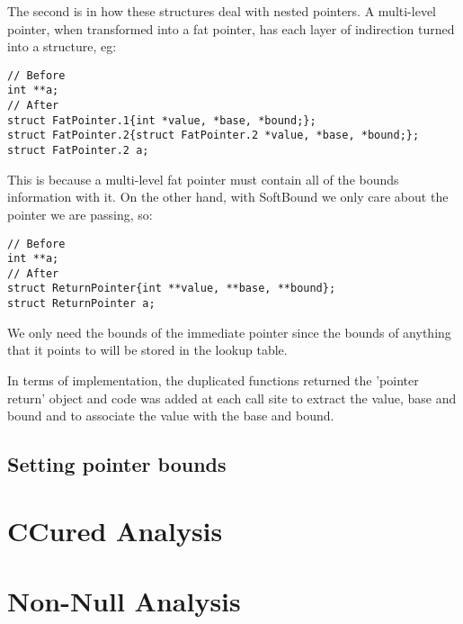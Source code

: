 The second is in how these structures deal with nested pointers.
A multi-level pointer, when transformed into a fat pointer, has each layer of indirection turned into a structure, eg:

\begin{verbatim}
// Before
int **a;
// After
struct FatPointer.1{int *value, *base, *bound;};
struct FatPointer.2{struct FatPointer.2 *value, *base, *bound;};
struct FatPointer.2 a;
\end{verbatim}

This is because a multi-level fat pointer must contain all of the bounds information with it.
On the other hand, with SoftBound we only care about the pointer we are passing, so:

\begin{verbatim}
// Before
int **a;
// After
struct ReturnPointer{int **value, **base, **bound};
struct ReturnPointer a;
\end{verbatim}

We only need the bounds of the immediate pointer since the bounds of anything that it points to will be stored in the lookup table.

In terms of implementation, the duplicated functions returned the 'pointer return' object and code was added at each call site to extract the value, base and bound and to associate the value with the base and bound.

\subsection{Setting pointer bounds}

\section{CCured Analysis}

\section{Non-Null Analysis}
